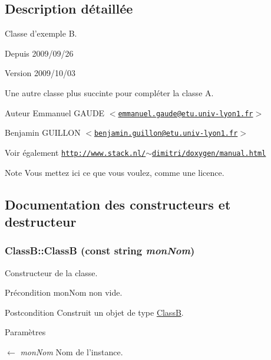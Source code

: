 \subsection{Description détaillée}
Classe d'exemple B. \begin{DoxySince}{Depuis}
2009/09/26 
\end{DoxySince}
\begin{DoxyVersion}{Version}
2009/10/03
\end{DoxyVersion}
Une autre classe plus succinte pour compléter la classe A. \begin{DoxyAuthor}{Auteur}
Emmanuel GAUDE $<$\href{mailto:emmanuel.gaude@etu.univ-lyon1.fr}{\tt emmanuel.gaude@etu.univ-\/lyon1.fr}$>$ 

Benjamin GUILLON $<$\href{mailto:benjamin.guillon@etu.univ-lyon1.fr}{\tt benjamin.guillon@etu.univ-\/lyon1.fr}$>$
\end{DoxyAuthor}
\begin{DoxySeeAlso}{Voir également}
\href{http://www.stack.nl/~dimitri/doxygen/manual.html}{\tt http://www.stack.nl/$\sim$dimitri/doxygen/manual.html} 
\end{DoxySeeAlso}
\begin{DoxyNote}{Note}
Vous mettez ici ce que vous voulez, comme une licence. 
\end{DoxyNote}


\subsection{Documentation des constructeurs et destructeur}
\hypertarget{class_class_b_a327bbcde6f569ee4d180d82aa894605e}{
\subsubsection[{ClassB}]{\setlength{\rightskip}{0pt plus 5cm}ClassB::ClassB (const string {\em monNom})}}
\label{class_class_b_a327bbcde6f569ee4d180d82aa894605e}


Constructeur de la classe. \begin{DoxyPrecond}{Précondition}
monNom non vide. 
\end{DoxyPrecond}
\begin{DoxyPostcond}{Postcondition}
Construit un objet de type \hyperlink{class_class_b}{ClassB}.
\end{DoxyPostcond}

\begin{DoxyParams}{Paramètres}
\item[\mbox{$\leftarrow$} {\em monNom}]Nom de l'instance.\end{DoxyParams}

